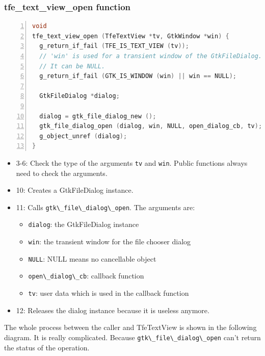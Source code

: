 \subsubsection{tfe\_text\_view\_open
function}\label{tfe_text_view_open-function}

\begin{lstlisting}[language=C, numbers=left]
void
tfe_text_view_open (TfeTextView *tv, GtkWindow *win) {
  g_return_if_fail (TFE_IS_TEXT_VIEW (tv));
  // 'win' is used for a transient window of the GtkFileDialog.
  // It can be NULL.
  g_return_if_fail (GTK_IS_WINDOW (win) || win == NULL);

  GtkFileDialog *dialog;

  dialog = gtk_file_dialog_new ();
  gtk_file_dialog_open (dialog, win, NULL, open_dialog_cb, tv);
  g_object_unref (dialog);
}
\end{lstlisting}

\begin{itemize}
\tightlist
\item
  3-6: Check the type of the arguments \passthrough{\lstinline!tv!} and
  \passthrough{\lstinline!win!}. Public functions always need to check
  the arguments.
\item
  10: Creates a GtkFileDialog instance.
\item
  11: Calls \passthrough{\lstinline!gtk\_file\_dialog\_open!}. The
  arguments are:

  \begin{itemize}
  \tightlist
  \item
    \passthrough{\lstinline!dialog!}: the GtkFileDialog instance
  \item
    \passthrough{\lstinline!win!}: the transient window for the file
    chooser dialog
  \item
    \passthrough{\lstinline!NULL!}: NULL means no cancellable object
  \item
    \passthrough{\lstinline!open\_dialog\_cb!}: callback function
  \item
    \passthrough{\lstinline!tv!}: user data which is used in the
    callback function
  \end{itemize}
\item
  12: Releases the dialog instance because it is useless anymore.
\end{itemize}

The whole process between the caller and TfeTextView is shown in the
following diagram. It is really complicated. Because
\passthrough{\lstinline!gtk\_file\_dialog\_open!} can't return the
status of the operation.

